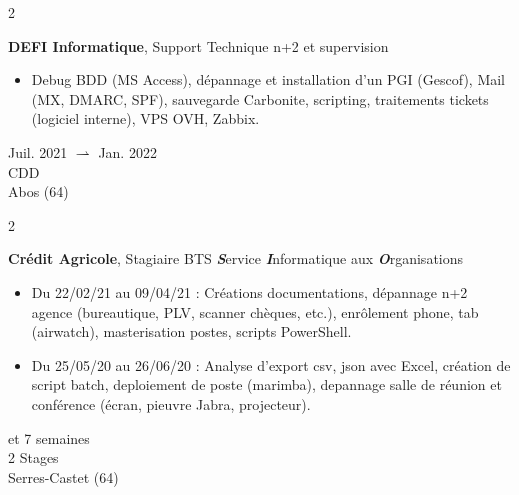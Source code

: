 \documentclass[11pt, a4paper]{article}
\newenvironment{highlights}{
    \begin{itemize}[
        topsep=0.10 cm,
        parsep=0.10 cm,
        partopsep=0pt,
        itemsep=0pt,
        leftmargin=0.4 cm + 10pt
    ]
}{
    \end{itemize}
} %
\newenvironment{twocolentry}[2][]{
    \onecolentry
    \def\secondColumn{#2}
    \setcolumnwidth{\fill, 4.5 cm}
    \begin{paracol}{2}
}{
    \switchcolumn \raggedleft \secondColumn
    \end{paracol}
    \endonecolentry
} %
\begin{document}
        \vspace{0.2 cm} %


        \begin{twocolentry}{
            Juil. 2021 $ \rightharpoonup $ Jan. 2022 \\
            CDD \\
            Abos (64)
        }
            \textbf{DEFI Informatique}, Support Technique n+2 et supervision 
            \begin{highlights}
                \item Debug BDD (MS Access), dépannage et installation d'un PGI (Gescof), Mail (MX, DMARC, SPF),
                sauvegarde Carbonite, scripting, traitements tickets (logiciel interne), VPS OVH, Zabbix.
            \end{highlights}
        \end{twocolentry}

        \vspace{0.2 cm}


        \begin{twocolentry}{
            4 et 7 semaines \\
            2 Stages \\
            Serres-Castet (64)
        }
            \textbf{Crédit Agricole}, Stagiaire BTS \textbf{\textit{S}}ervice \textbf{\textit{I}}nformatique aux \textbf{\textit{O}}rganisations
            \begin{highlights}
                \item Du 22/02/21 au 09/04/21 : Créations documentations, dépannage n+2 agence (bureautique, PLV, scanner chèques, etc.), enrôlement phone, tab (airwatch), masterisation postes, scripts PowerShell.
                \item Du 25/05/20 au 26/06/20 : Analyse d’export csv, json avec Excel, création de script batch, deploiement de poste (marimba), depannage salle de réunion et conférence (écran, pieuvre Jabra, projecteur).
            \end{highlights}
        \end{twocolentry}

        \vspace{0.2 cm}

        
\end{document}
